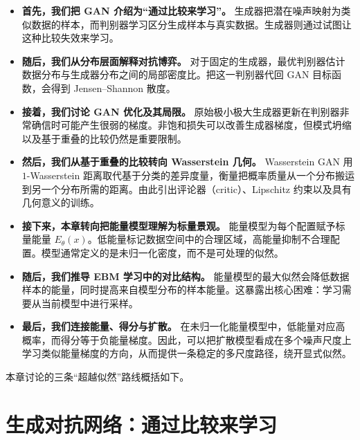 \begin{itemize}

    \item[\(\rightarrow\)] \textbf{首先，我们把 GAN 介绍为“通过比较来学习”。}  
    生成器把潜在噪声映射为类似数据的样本，而判别器学习区分生成样本与真实数据。生成器则通过试图让这种比较失效来学习。

    \item[\(\rightarrow\)] \textbf{随后，我们从分布层面解释对抗博弈。}  
    对于固定的生成器，最优判别器估计数据分布与生成器分布之间的局部密度比。把这一判别器代回 GAN 目标函数，会得到 Jensen--Shannon 散度。

    \item[\(\rightarrow\)] \textbf{接着，我们讨论 GAN 优化及其局限。}  
    原始极小极大生成器更新在判别器非常确信时可能产生很弱的梯度。非饱和损失可以改善生成器梯度，但模式坍缩以及基于重叠的比较仍然是重要限制。

    \item[\(\rightarrow\)] \textbf{然后，我们从基于重叠的比较转向 Wasserstein 几何。}  
    Wasserstein GAN 用 $1$-Wasserstein 距离取代基于分类的差异度量，衡量把概率质量从一个分布搬运到另一个分布所需的距离。由此引出评论器（critic）、Lipschitz 约束以及具有几何意义的训练。

    \item[\(\rightarrow\)] \textbf{接下来，本章转向把能量模型理解为标量景观。}  
    能量模型为每个配置赋予标量能量 $E_\theta(x)$。低能量标记数据空间中的合理区域，高能量抑制不合理配置。模型通常定义的是未归一化密度，而不是可处理的似然。

    \item[\(\rightarrow\)] \textbf{随后，我们推导 EBM 学习中的对比结构。}  
    能量模型的最大似然会降低数据样本的能量，同时提高来自模型分布的样本能量。这暴露出核心困难：学习需要从当前模型中进行采样。

    \item[\(\rightarrow\)] \textbf{最后，我们连接能量、得分与扩散。}  
    在未归一化能量模型中，低能量对应高概率，而得分等于负能量梯度。因此，可以把扩散模型看成在多个噪声尺度上学习类似能量梯度的方向，从而提供一条稳定的多尺度路径，绕开显式似然。

\end{itemize}

\noindent 本章讨论的三条“超越似然”路线概括如下。


\section{生成对抗网络：通过比较来学习}

